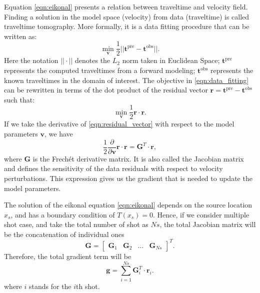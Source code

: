 Equation \eqref{eqn:eikonal} presents a relation between traveltime and velocity field. Finding a solution in the model space (velocity) from data (traveltime) is called traveltime tomography. More formally, it is a data fitting procedure that can be written as:
\begin{equation}
    \label{eqn:data_fitting}
    \min_{\mathbf{v}}\frac{1}{2}||\mathbf{t}^{\text{pre}}-\mathbf{t}^{\text{obs}}||.
\end{equation}
Here the notation $||\cdot||$ denotes the $L_2$ norm taken in Euclidean Space; $\mathbf{t}^\text{pre}$ represents the computed traveltimes from a forward modeling; $\mathbf{t}^\text{obs}$ represents the known traveltimes in the domain of interest. The objective in \eqref{eqn:data_fitting} can be rewritten in terms of the dot product of the residual vector $\mathbf{r}=\mathbf{t}^\text{pre}-\mathbf{t}^\text{obs}$ such that:
\begin{equation}
    \label{eqn:residual_vector}
    \min_{\mathbf{v}}\frac{1}{2}\mathbf{r} \cdot \mathbf{r} .
\end{equation}
If we take the derivative of \eqref{eqn:residual_vector} with respect to the model parameters $\mathbf{v}$, we have 
\begin{equation}
    \label{eqn:gradient}
    \frac{1}{2}\frac{\partial}{\partial \mathbf{v}} \mathbf{r} \cdot \mathbf{r} = \mathbf{G}^T \cdot \mathbf{r},
\end{equation}
where $\mathbf{G}$ is the Frechét derivative matrix. It is also called the Jacobian matrix and defines the sensitivity of the data residuals with respect to velocity perturbations. This expression gives us the gradient that is needed to update the model parameters. 

The solution of the eikonal equation \eqref{eqn:eikonal} depends on the source location  $x_s$, and has a boundary condition of $T(x_s) = 0$. Hence, if we consider multiple shot case, and take the total number of shot as $Ns$, the total Jacobian matrix will be the concatenation of individual ones
\begin{equation}
    \label{eqn:jacobian}
    \mathbf{G}=\begin{bmatrix} \mathbf{G}_1 & \mathbf{G}_2 & \dots  & \mathbf{G}_{Ns} \end{bmatrix}^T.
\end{equation}
Therefore, the total gradient term will be
\begin{equation}
    \label{eqn:gradient_term}
    \mathbf{g}=\sum_{i=1}^{Ns}\mathbf{G}_i^T \cdot \mathbf{r}_i .
\end{equation}
where $i$ stands for the $i$th shot. 

